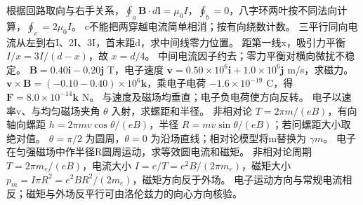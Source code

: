 \workings 根据回路取向与右手关系，$\oint_a\bm B\cdot d\bm l=\mu_0I$，$\oint_b=0$，八字环两叶按不同法向计算，$\oint_c=2\mu_0I$。
\crosscheck c不能把两穿越电流简单相消；按有向绕数计数。
\problemtext 三平行同向电流从左到右I、2I、3I，首末距d，求中间线零力位置。
\workings 距第一线x，吸引力平衡 $I/x=3I/(d-x)$，故 $x=d/4$。
\crosscheck 中间电流因子约去；零力平衡对横向微扰不稳定。
\problemtext $\bm B=0.40\bm i-0.20\bm j$ T，电子速度 $\bm v=0.50\times10^6\bm i+1.0\times10^6\bm j$ m/s，求磁力。
\workings $\bm v\times\bm B=(-0.10-0.40)\times10^6\bm k$，乘电子电荷 $-1.6\times10^{-19}$ C，得 $\bm F=8.0\times10^{-14}\bm k$ N。
\crosscheck 与速度及磁场均垂直；电子负电荷使方向反转。
\problemtext 电子以速率v、与均匀磁场夹角 $\theta$ 入射，求螺距和半径。
\workings 非相对论 $T=2\pi m/(eB)$，有向轴向螺距 $h=2\pi mv\cos\theta/(eB)$，半径 $R=mv\sin\theta/(eB)$；若问螺距大小取绝对值。
\crosscheck $\theta=\pi/2$ 为圆周，$\theta=0$ 为沿场直线；相对论模型将m替换为 $\gamma m$。
\problemtext 电子在匀强磁场中作半径R圆周运动，求等效圆电流和磁矩。
\workings 非相对论周期 $T=2\pi m_e/(eB)$，电流大小 $I=e/T=e^2B/(2\pi m_e)$，磁矩大小 $p_m=I\pi R^2=e^2BR^2/(2m_e)$，磁矩方向反于外场。
\crosscheck 电子运动方向与常规电流相反；磁矩与外场反平行可由洛伦兹力的向心方向核验。


